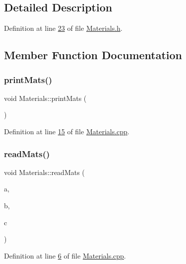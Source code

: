 \subsection{Detailed Description}


Definition at line \hyperlink{_materials_8h_source_l00023}{23} of file \hyperlink{_materials_8h_source}{Materials.\+h}.



\subsection{Member Function Documentation}
\mbox{\label{class_materials_acce0e8fc2993ca136273747fd75b8fc1}} 
\subsubsection{\texorpdfstring{print\+Mats()}{printMats()}}
{\footnotesize\ttfamily void Materials\+::print\+Mats (\begin{DoxyParamCaption}{ }\end{DoxyParamCaption})}



Definition at line \hyperlink{_materials_8cpp_source_l00015}{15} of file \hyperlink{_materials_8cpp_source}{Materials.\+cpp}.

\mbox{\label{class_materials_a06e59a5742730b2292d39b7488523505}} 
\subsubsection{\texorpdfstring{read\+Mats()}{readMats()}}
{\footnotesize\ttfamily void Materials\+::read\+Mats (\begin{DoxyParamCaption}\item[{int}]{a,  }\item[{std\+::string}]{b,  }\item[{Vector\+Xd}]{c }\end{DoxyParamCaption})}



Definition at line \hyperlink{_materials_8cpp_source_l00006}{6} of file \hyperlink{_materials_8cpp_source}{Materials.\+cpp}.

